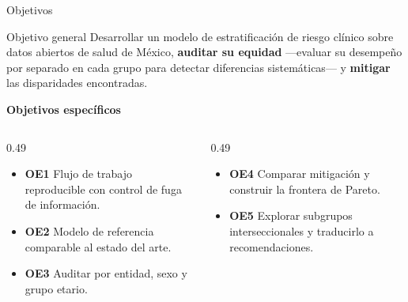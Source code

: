 \documentclass[aspectratio=169,11pt]{beamer}
\newcommand{\resalta}[1]{{\color{vino}\bfseries #1}}
\begin{document}
\begin{frame}{Objetivos}
  \vspace{0.3em}
  \begin{center}
  \begin{minipage}{0.93\textwidth}
    \begin{block}{Objetivo general}
      Desarrollar un modelo de estratificación de riesgo clínico sobre datos
      abiertos de salud de México, \resalta{auditar su equidad} —evaluar su
      desempeño por separado en cada grupo para detectar diferencias
      sistemáticas— y \resalta{mitigar} las disparidades encontradas.
    \end{block}
  \end{minipage}
  \end{center}

  \vspace{0.7em}
  {\bfseries Objetivos específicos}
  \begin{columns}[T,onlytextwidth]
    \begin{column}{0.49\textwidth}
      \begin{itemize}\setlength\itemsep{0.25em}
        \item[\textcolor{naranja}{\scriptsize$\blacksquare$}] {\small\textbf{OE1}
              Flujo de trabajo reproducible con control de fuga de información.}
        \item[\textcolor{naranja}{\scriptsize$\blacksquare$}] {\small\textbf{OE2}
              Modelo de referencia comparable al estado del arte.}
        \item[\textcolor{naranja}{\scriptsize$\blacksquare$}] {\small\textbf{OE3}
              Auditar por entidad, sexo y grupo etario.}
      \end{itemize}
    \end{column}
    \begin{column}{0.49\textwidth}
      \begin{itemize}\setlength\itemsep{0.25em}
        \item[\textcolor{naranja}{\scriptsize$\blacksquare$}] {\small\textbf{OE4}
              Comparar mitigación y construir la frontera de Pareto.}
        \item[\textcolor{naranja}{\scriptsize$\blacksquare$}] {\small\textbf{OE5}
              Explorar subgrupos interseccionales y traducirlo a
              recomendaciones.}
      \end{itemize}
    \end{column}
  \end{columns}
\end{frame}
\end{document}
